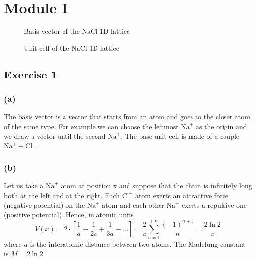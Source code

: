 \documentclass{article}
\begin{document}
\section*{Module I}

\begin{figure}[ht]

\begin{minipage}{0.5\textwidth}
	\centering
	\caption{Basis vector of the $\text{NaCl}$ 1D lattice}
	\label{fig:1DNaCl}
\end{minipage}
\begin{minipage}{0.5\textwidth}
    \centering
    \caption{Unit cell of the $\text{NaCl}$ 1D lattice}
\end{minipage}
\end{figure}

\subsection*{Exercise 1}

\subsubsection*{(a)}
The basis vector is a vector that starts from an atom and goes to the closer atom of the same type. For example we can choose the leftmost $\text{Na}^+$ as the origin and we draw a vector until the second $\text{Na}^+$. The base unit cell is made of a couple $\text{Na}^+ + \text{Cl}^-$.

\subsubsection*{(b)}
Let us take a $\text{Na}^+$ atom at position x and suppose that the chain is infinitely long both at the left and at the right. Each $\text{Cl}^-$ atom exerts an attractive force (negative potential) on the $\text{Na}^+$ atom and each other $\text{Na}^+$ exerts a repulsive one (positive potential). Hence, in atomic units
$$V(x) = 2 \cdot \left[\frac{1}{a} - \frac{1}{2a} + \frac{1}{3a} - \dots \right]= \frac{2}{a }\sum_{n=1}^{+\infty} \frac{(-1)^{n+1}}{n} = \frac{2 \ln 2}{a}$$
where $a$ is the interatomic distance between two atoms. The Madelung constant is $M = 2 \ln 2$ 
\end{document}
